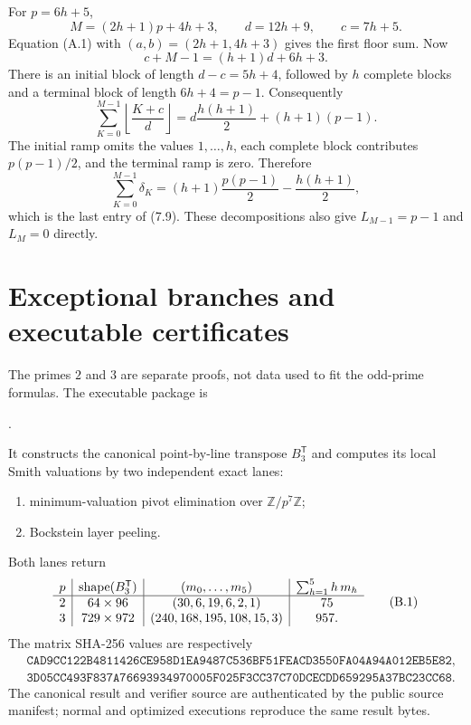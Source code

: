 \documentclass[12pt,a4paper]{article}
\theoremstyle{definition}
\newcommand{\Z}{\mathbb Z}
\newcommand{\transpose}{\mathsf T}
\begin{document}
For $p=6h+5$,
\[
 M=(2h+1)p+4h+3,\qquad d=12h+9,\qquad c=7h+5.
\]
Equation (A.1) with $(a,b)=(2h+1,4h+3)$ gives the first floor sum.  Now
\[
 c+M-1=(h+1)d+6h+3.
\]
There is an initial block of length $d-c=5h+4$, followed by $h$ complete
blocks and a terminal block of length $6h+4=p-1$.  Consequently
\[
 \sum_{K=0}^{M-1}\left\lfloor\frac{K+c}{d}\right\rfloor
 =d\frac{h(h+1)}2+(h+1)(p-1).
\tag{A.3}
\]
The initial ramp omits the values $1,\ldots,h$, each complete block
contributes $p(p-1)/2$, and the terminal ramp is zero.  Therefore
\[
 \sum_{K=0}^{M-1}\delta_K
 =(h+1)\frac{p(p-1)}2-\frac{h(h+1)}2,
\tag{A.4}
\]
which is the last entry of (7.9).  These decompositions also give
$L_{M-1}=p-1$ and $L_M=0$ directly.

\section{Exceptional branches and executable certificates}
\label{app:exceptional-branches}

The primes $2$ and $3$ are separate proofs, not data used to fit the
odd-prime formulas.  The executable package is
\begin{center}
.
\end{center}
It constructs the canonical point-by-line transpose $B_3^\transpose$ and
computes its local Smith valuations by two independent exact lanes:

\begin{enumerate}
\item minimum-valuation pivot elimination over $\Z/p^7\Z$;
\item Bockstein layer peeling.
\end{enumerate}

Both lanes return
\[
 \begin{array}{c|c|c|c}
p&\operatorname{shape}(B_3^\transpose)&(m_0,\ldots,m_5)&
 \sum_{h=1}^{5}h\,m_h\\ \hline
 2&64\times96&\FCIGDThreeSmithProfileTwo&75\\
 3&729\times972&\FCIGDThreeSmithProfileThree&957.
 \end{array}
\tag{B.1}
\]
The matrix SHA-256 values are respectively
\[
 \begin{split}
 &\texttt{CAD9CC122B4811426CE958D1EA9487C536BF51FEACD3550FA04A94A012EB5E82},\\
 &\texttt{3D05CC493F837A76693934970005F025F3CC37C70DCECDD659295A37BC23CC68}.
 \end{split}
\]
The canonical result and verifier source are authenticated by the public
source manifest; normal and optimized executions reproduce the same result
bytes.
\end{document}
